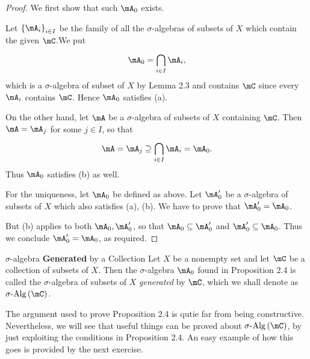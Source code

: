 \documentclass[pmath450]{subfiles}
\begin{document}
    \begin{proof}
        We first show that such $\mA_0$ exists.

        Let $\left\lbrace \mA_i \right\rbrace^{}_{i\in I}$ be the family of all the $\sigma$-algebras of subsets of $X$ which contain the given $\mC$.\footnotemark[1] We put
        \begin{equation*}
            \mA_0 = \bigcap^{}_{i\in I}\mA_i,
        \end{equation*}
        which is a $\sigma$-algebra of subset of $X$ by Lemma 2.3 and contains $\mC$ since every $\mA_i$ contains $\mC$. Hence $\mA_0$ satisfies (a).

        On the other hand, let $\mA$ be a $\sigma$-algebra of subsets of $X$ containing $\mC$. Then $\mA=\mA_j$ for some $j\in I$, so that
        \begin{equation*}
            \mA = \mA_j \supseteq\bigcap^{}_{i\in I}\mA_i = \mA_0.
        \end{equation*}
        Thus $\mA_0$ satisfies (b) as well.

        For the uniqueness, let $\mA_0$ be defined as above. Let $\mA_0'$ be a $\sigma$-algebra of subsets of $X$ which also satisfies (a), (b). We have to prove that $\mA_0'=\mA_0$.

        But (b) applies to both $\mA_0,\mA_0'$, so that $\mA_0\subseteq\mA_0'$ and $\mA_0'\subseteq\mA_0$. Thus we conclude $\mA_0'=\mA_0$, as required.

        \noindent
        \begin{minipage}{\textwidth}
        \end{minipage}
    \end{proof}

    \begin{definition}{$\sigma$-algebra \textbf{Generated} by a Collection}
        Let $X$ be a nonempty set and let $\mC$ be a collection of subsets of $X$. Then the $\sigma$-algebra $\mA_0$ found in Proposition 2.4 is called the $\sigma$-algebra of subsets of $X$ \emph{generated} by $\mC$, which we shall denote as $\sigalg\left( \mC \right)$.
    \end{definition}

    \np The argument used to prove Proposition 2.4 is qutie far from being constructive. Nevertheless, we will see that useful things can be proved about $\sigalg\left( \mC \right)$, by just exploiting the conditions in Proposition 2.4. An easy example of how this goes is provided by the next exercise.
\end{document}
